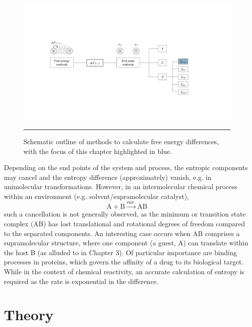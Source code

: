 \documentclass[../main.tex]{subfiles}
\begin{document}
\begin{figure}[h!]
	\centering
	\includegraphics[width=14.5cm]{4/figs/figXA_intro/figXA_intro}
	\vspace{0.4cm}
	\hrule
	\caption{Schematic outline of methods to calculate free energy differences, with the focus of this chapter highlighted in blue.}
	\label{fig::entropy_XA_intro}
\end{figure}

Depending on the end points of the  system and process, the entropic components may cancel and the entropy difference (approximately) vanish, e.g. in unimolecular transformations. However, in an intermolecular chemical process within an environment (e.g. solvent/supramolecular catalyst),
\begin{equation}
\text{A} + \text{B} \xrightarrow{\text{env.}} \text{AB}
\end{equation}
such a cancellation is not generally observed, as the minimum or transition state complex (AB) has lost translational and rotational degrees of freedom compared to the separated components.\cite{Jensen1999} An interesting case occurs when AB comprises a supramolecular structure, where one component (a guest, A) can translate within the host B (as alluded to in Chapter 3). Of particular importance are binding processes in proteins, which govern the affinity of a drug to its biological target.\cite{Woo2005} While in the context of chemical reactivity, an accurate calculation of entropy is required as the rate is exponential in the difference.

\section{Theory}
\end{document}
